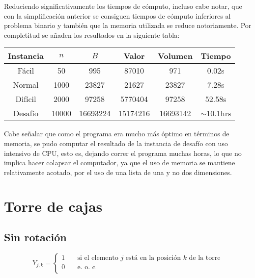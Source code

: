 \documentclass[letterpaper,10pt]{article}
\begin{document}
  Reduciendo significativamente los tiempos de cómputo, incluso cabe notar, que con la simplificación anterior se consiguen tiempos de cómputo inferiores al problema binario y también que la memoria utilizada se reduce notoriamente. Por completitud se añaden los resultados en la siguiente tabla:

  \begin{center}
    \begin{tabular}{c|c|c|c|c|c}
      Instancia & $n$ & $B$ & Valor & Volumen & Tiempo\\\hline
      Fácil & 50 & 995 & 87010 & 971 & 0.02s\\
      Normal & 1000 & 23827 & 21627 & 23827 & 7.28s\\
      Difícil & 2000 & 97258 & 5770404 & 97258 & 52.58s\\
      Desafío & 10000 & 16693224 & 15174216 & 16693142 & $\sim$10.1hrs\\
    \end{tabular}
  \end{center}
  
  Cabe señalar que como el programa era mucho más óptimo en términos de memoria, se pudo computar el resultado de la instancia de desafío con uso intensivo de CPU, esto es, dejando correr el programa muchas horas, lo que no implica hacer colapsar el computador, ya que el uso de memoria se mantiene relativamente acotado, por el uso de una lista de una y no dos dimensiones.

\section{Torre de cajas}

\subsection{Sin rotación}

\[
    Y_{j,k} =
         \begin{cases}
           1 &\quad\text{si el elemento $j$ está en la posición $k$ de la torre} \\
           0 &\quad\text{e. o. c } \\
         \end{cases}
\]
\end{document}
